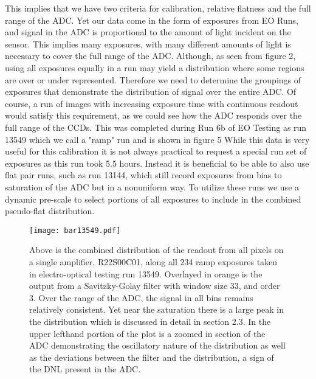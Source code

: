 \documentclass[11pt, letterpaper]{article}
\begin{document}
This implies that we have two criteria for calibration, relative flatness and the full range of the ADC. 
Yet our data come in the form of exposures from EO Runs, and signal in the ADC is proportional to the amount of light incident on the sensor. 
This implies many exposures, with many different amounts of light is necessary to cover the full range of the ADC. 
Although, as seen from figure 2, using all exposures equally in a run may yield a distribution where some regions are over or under represented. 
Therefore we need to determine the groupings of exposures that demonstrate the distribution of signal over the entire ADC. 
Of course, a run of images with increasing exposure time with continuous readout would satisfy this requirement, as we could see how the ADC responds over the full range of the CCDs. 
This was completed during Run 6b of EO Testing as run 13549 which we call a "ramp" run and is shown in figure 5
While this data is very useful for this calibration it is not always practical to request a special run set of exposures as this run took 5.5 hours.
Instead it is beneficial to be able to also use flat pair runs, such as run 13144, which still record exposures from bias to saturation of the ADC but in a nonuniform way.
To utilize these runs we use a dynamic pre-scale to select portions of all exposures to include in the combined pseudo-flat distribution. 

\begin{figure}
	\texttt{[image: bar13549.pdf]}
	\caption{Above is the combined distribution of the readout from all pixels on a single amplifier, R22S00C01, along all 234 ramp exposures taken in electro-optical testing run 13549. Overlayed in orange is the output from a Savitzky-Golay filter with window size 33, and order 3. Over the range of the ADC, the signal in all bins remains relatively consistent. Yet near the saturation there is a large peak in the distribution which is discussed in detail in section 2.3. In the upper lefthand portion of the plot is a zoomed in section of the ADC demonstrating the oscillatory nature of the distribution as well as the deviations between the filter and the distribution, a sign of the DNL present in the ADC.}
\end{figure}
\indent
\end{document}
